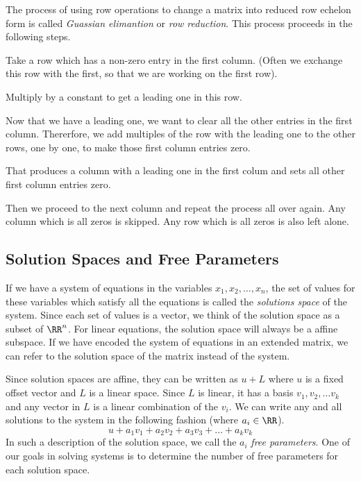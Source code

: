 \documentclass[fleqn]{report}
\begin{document}
\begin{defn}
The process of using row operations to change a matrix into
reduced row echelon form is called \emph{Guassian elimantion} or
\emph{row reduction}. This process proceeds in the following steps.
\begin{smallitemize}
\item Take a row which has a non-zero entry in the first
column. (Often we exchange this row with the first, so that we
are working on the first row). 
\item Multiply by a constant to get a leading one in this row.
\item Now that we have a leading one, we want to clear all the
other entries in the first column. Thererfore, we add multiples of
the row with the leading one to the other rows, one by one, to
make those first column entries zero.
\item That produces a column with a leading one in the first
colum and sets all other first column entries zero. 
\item Then we proceed to the next column and repeat
the process all over again. Any column which is all zeros is
skipped. Any row which is all zeros is also left alone.
\end{smallitemize}
\end{defn}

\subsection{Solution Spaces and Free Parameters}
\label{solutions-spaces}

\begin{defn}
If we have a system of equations in the variables $x_1, x_2,
\ldots, x_n$, the set of values for these variables which
satisfy all the equations is called the \emph{solutions space}
of the system. Since each set of values is a vector, we think
of the solution space as a subset of $\RR^n$. For linear
equations, the solution space will always be a affine subspace.
If we have encoded the system of equations in an extended
matrix, we can refer to the solution space of the matrix
instead of the system.
\end{defn}

\begin{defn}
Since solution spaces are affine, they can be written as $u +
L$ where $u$ is a fixed offset vector and $L$ is a linear
space. Since $L$ is linear, it has a basis $v_1, v_2, \ldots
v_k$ and any vector in $L$ is a linear combination of the
$v_i$. We can write any and all solutions to the
system in the following fashion (where $a_i \in \RR$).
\begin{equation*}
u + a_1v_1 + a_2v_2 + a_3v_3 + \ldots + a_kv_k
\end{equation*}
In such a description of the solution space, we call the $a_i$
\emph{free parameters}. One of our goals in solving systems is
to determine the number of free parameters for each solution
space.
\end{defn}
\end{document}
